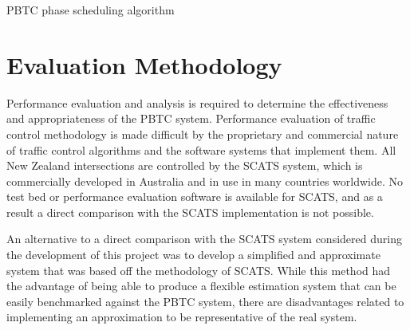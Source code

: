 \begin{algorithm}[H]
 \SetAlgoLined
 \caption{PBTC phase scheduling algorithm}
\end{algorithm}


\section{Evaluation Methodology}

Performance evaluation and analysis is required to determine the effectiveness and appropriateness of the PBTC system. Performance evaluation of traffic control methodology is made difficult by the proprietary and commercial nature of traffic control algorithms and the software systems that implement them. All New Zealand intersections are controlled by the SCATS system, which is commercially developed in Australia and in use in many countries worldwide. No test bed or performance evaluation software is available for SCATS, and as a result a direct comparison with the SCATS implementation is not possible.

An alternative to a direct comparison with the SCATS system considered during the development of this project was to develop a simplified and approximate system that was based off the methodology of SCATS. While this method had the advantage of being able to produce a flexible estimation system that can be easily benchmarked against the PBTC system, there are disadvantages related to implementing an approximation to be representative of the real system. 

